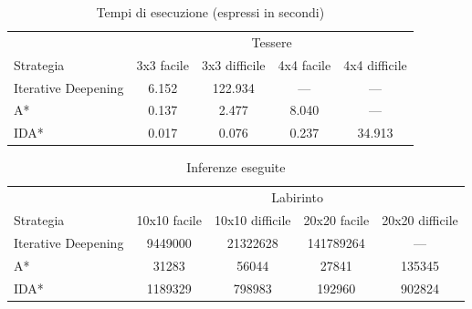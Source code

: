 \documentclass[a4paper,oneside,12pt]{book}
\begin{document}
    \begin{table}
        \centering
        \begin{tabular}{l c c c c}
            \toprule %
            & \multicolumn{4}{c}{Tessere} \\ %
            \cmidrule(l){2-5} %
            Strategia & 3x3 facile & 3x3 difficile & 4x4 facile & 4x4 difficile\\ %
            \midrule %
            Iterative Deepening
            & 6.152	 & 122.934 & --- & --- \\ %
            A*
            & 0.137 & 2.477 & 8.040 & ---\\ %
            IDA*
            & 0.017 & 0.076 & 0.237 & 34.913 \\ %

            \bottomrule
        \end{tabular}
        \caption{Tempi di esecuzione (espressi in secondi)}
    \end{table}
    \begin{table}
        \centering
        \begin{tabular}{l c c c c}
            \toprule %
            & \multicolumn{4}{c}{Labirinto} \\ %
            \cmidrule(l){2-5} %
            Strategia & 10x10 facile & 10x10 difficile & 20x20 facile & 20x20 difficile\\ %
            \midrule %
            Iterative Deepening
            & \num{9449000}& \num{21322628} & \num{141789264} & --- \\ %
            A*
            & \num{31283} & \num{56044} & \num{27841} & \num{135345}\\ %
            IDA*
            & \num{1189329} & \num{798983} & \num{192960} & \num{902824} \\ %

            \bottomrule
        \end{tabular}
        \caption{Inferenze eseguite}
    \end{table}
\end{document}
